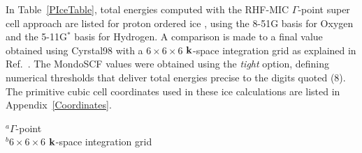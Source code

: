 \documentclass[prb,aps,nobibnotes,twocolumn,doublespace,twocolumngrid,superbib]{revtex4}
\begin{document}

In Table~\ref{PIceTable}, total energies computed with the RHF-MIC $\Gamma$-point
super cell approach are listed for proton ordered ice \cite{}, using the 8-51G basis 
for Oxygen and the 5-11G$^*$ basis for Hydrogen.  A comparison is made to a final 
value obtained using {\sc Cyrstal98} with a $6\times6\times6$ ${\bf k}$-space integration grid
as explained in Ref.~\cite{PIceProceedure}.  The {\sc MondoSCF} values were obtained 
using the {\it tight} option, defining numerical thresholds that deliver total energies
precise to the digits quoted (8).  The primitive cubic cell coordinates used in these
ice calculations are listed in Appendix~\ref{Coordinates}.

\begin{table}[h]
\caption{Progression of $\Gamma$-point super-cell calculations of proton ordered ice
at the RHF-MIC/8-51G/5-11G$^*$ level of theory.   Comparison is made to a final value 
approaching the ${\bf k}$-space integration limit for the primitive cell.}
\label{PIceTable}
\raggedright{
{\hskip 0.230in}$^a \Gamma$-point\\
{\hskip 0.230in}$^b 6\times6\times6$ ${\bf k}$-space integration grid \\}
\end{table}
\end{document}
